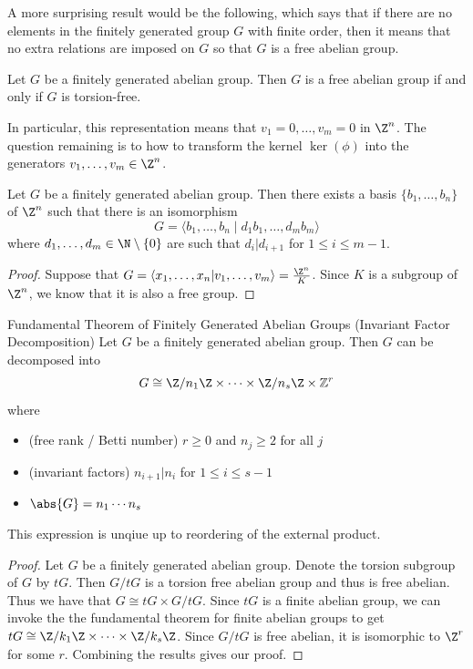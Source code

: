 \documentclass[a4paper]{article}
\begin{document}
A more surprising result would be the following, which says that if there are no elements in the finitely generated group $G$ with finite order, then it means that no extra relations are imposed on $G$ so that $G$ is a free abelian group. 

\begin{prp}{}{} Let $G$ be a finitely generated abelian group. Then $G$ is a free abelian group if and only if $G$ is torsion-free. 
\end{prp}

In particular, this representation means that $v_1=0,\dots,v_m=0$ in $\Z^n$. The question remaining is to how to transform the kernel $\ker(\phi)$ into the generators $v_1,\dots,v_m\in\Z^n$. 

\begin{prp}{}{} Let $G$ be a finitely generated abelian group. Then there exists a basis $\{b_1,\dots,b_n\}$ of $\Z^n$ such that there is an isomorphism $$G=\langle b_1,\dots,b_n\;|\;d_1b_1,\dots,d_mb_m\rangle$$ where $d_1,\dots,d_m\in\N\setminus\{0\}$ are such that $d_i|d_{i+1}$ for $1\leq i\leq m-1$. 
\begin{proof}
Suppose that $G=\langle x_1,\dots,x_n|v_1,\dots,v_m\rangle=\frac{\Z^n}{K}$. Since $K$ is a subgroup of $\Z^n$, we know that it is also a free group. 
\end{proof}
\end{prp}

\begin{thm}{Fundamental Theorem of Finitely Generated Abelian Groups (Invariant Factor Decomposition)}{} Let $G$ be a finitely generated abelian group. Then $G$ can be decomposed into $$G\cong \Z/n_1\Z\times\cdots\times\Z/n_s\Z\times\mathbb{Z}^r$$ where 
\begin{itemize}
\item (free rank / Betti number) $r\geq 0$ and $n_j\geq 2$ for all $j$
\item (invariant factors) $n_{i+1}|n_i$ for $1\leq i\leq s-1$
\item $\abs{G}=n_1\cdots n_s$
\end{itemize}
This expression is unqiue up to reordering of the external product. 
\begin{proof}
Let $G$ be a finitely generated abelian group. Denote the torsion subgroup of $G$ by $tG$. Then $G/tG$ is a torsion free abelian group and thus is free abelian. Thus we have that $G\cong tG\times G/tG$. Since $tG$ is a finite abelian group, we can invoke the the fundamental theorem for finite abelian groups to get $tG\cong\Z/k_1\Z\times\cdots\times\Z/k_s\Z$. Since $G/tG$ is free abelian, it is isomorphic to $\Z^r$ for some $r$. Combining the results gives our proof. 
\end{proof}
\end{thm}
\end{document}
